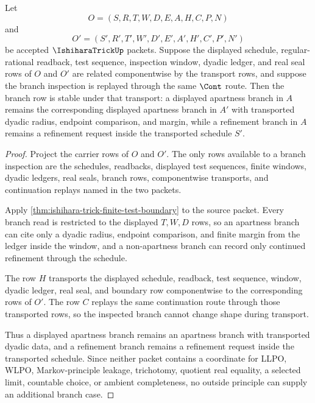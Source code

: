 \begin{theorem}
\label{thm:ishihara-trick-branch-stability}
Let
$$
O=(S,R,T,W,D,E,A,H,C,P,N)
$$
and
$$
O'=(S',R',T',W',D',E',A',H',C',P',N')
$$
be accepted $\IshiharaTrickUp$ packets. Suppose the displayed schedule, regular-rational readback, test sequence, inspection window, dyadic ledger, and real seal rows of $O$ and $O'$ are related componentwise by the transport rows, and suppose the branch inspection is replayed through the same $\Cont$ route. Then the branch row is stable under that transport: a displayed apartness branch in $A$ remains the corresponding displayed apartness branch in $A'$ with transported dyadic radius, endpoint comparison, and margin, while a refinement branch in $A$ remains a refinement request inside the transported schedule $S'$.
\end{theorem}
\begin{proof}
Project the carrier rows of $O$ and $O'$. The only rows available to a branch inspection are the schedules, readbacks, displayed test sequences, finite windows, dyadic ledgers, real seals, branch rows, componentwise transports, and continuation replays named in the two packets.

Apply \autoref{thm:ishihara-trick-finite-test-boundary} to the source packet. Every branch read is restricted to the displayed $T,W,D$ rows, so an apartness branch can cite only a dyadic radius, endpoint comparison, and finite margin from the ledger inside the window, and a non-apartness branch can record only continued refinement through the schedule.

The row $H$ transports the displayed schedule, readback, test sequence, window, dyadic ledger, real seal, and boundary row componentwise to the corresponding rows of $O'$. The row $C$ replays the same continuation route through those transported rows, so the inspected branch cannot change shape during transport.

Thus a displayed apartness branch remains an apartness branch with transported dyadic data, and a refinement branch remains a refinement request inside the transported schedule. Since neither packet contains a coordinate for LLPO, WLPO, Markov-principle leakage, trichotomy, quotient real equality, a selected limit, countable choice, or ambient completeness, no outside principle can supply an additional branch case.
\end{proof}

